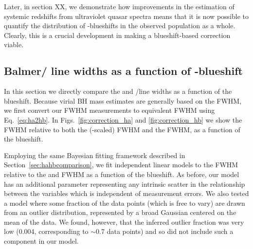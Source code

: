Later, in section XX, we demonstrate how improvements in the estimation of systemic redshifts from ultraviolet quasar spectra means that it is now possible to quantify the distribution of -blueshifts in the observed population as a whole. 
Clearly, this is a crucial development in making a blueshift-based correction viable.

\subsection{Balmer/ line widths as a function of -blueshift}
\label{sec:correction}

In this section we directly compare the  and \hans/\hb line widths as a function of the  blueshift. 
Because virial BH mass estimates are generally based on the \hb FWHM, we first convert our \ha FWHM measurements to equivalent \hb FWHM using Eq.~\ref{eq:ha2hb}.  
In Figs.~\ref{fig:correction_ha} and \ref{fig:correction_hb} we show the  FWHM relative to both the (\hbns-scaled) \ha FWHM and the \hb FWHM, as a function of the  blueshift. 

Employing the same Bayesian fitting framework described in Section~\ref{sec:hahbcomparison}, we fit independent linear models to the  FWHM relative to the \ha and \hb FWHM as a function of the  blueshift. 
As before, our model has an additional parameter representing any intrinsic scatter in the relationship between the variables which is independent of measurement errors.  
We also tested a model where some fraction of the data points (which is free to vary) are drawn from an outlier distribution, represented by a broad Gaussian centered on the mean of the data. 
We found, however, that the inferred outlier fraction was very low (0.004, corresponding to $\sim$0.7 data points) and so did not include such a component in our model. 

